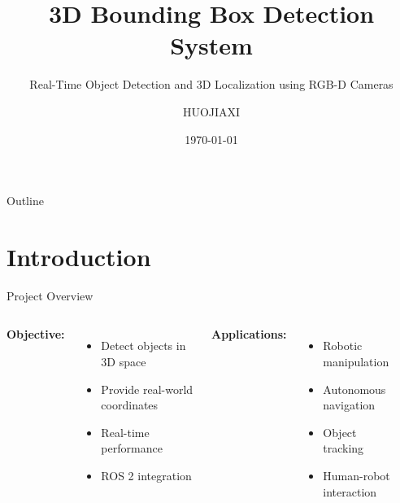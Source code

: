 \documentclass[aspectratio=169]{beamer}
\title{3D Bounding Box Detection System}
\subtitle{Real-Time Object Detection and 3D Localization using RGB-D Cameras}
\author{HUOJIAXI}
\institute{ROS 2 Humble + YOLO + Point Cloud Processing}
\date{\today}
\begin{document}
\begin{frame}
\titlepage
\end{frame}

\begin{frame}{Outline}
\tableofcontents
\end{frame}

\section{Introduction}

\begin{frame}{Project Overview}
\begin{columns}
\textbf{Objective:}
\begin{itemize}
    \item Detect objects in 3D space
    \item Provide real-world coordinates
    \item Real-time performance
    \item ROS 2 integration
\end{itemize}

\vspace{1em}
\textbf{Applications:}
\begin{itemize}
    \item Robotic manipulation
    \item Autonomous navigation
    \item Object tracking
    \item Human-robot interaction
\end{itemize}

\begin{center}
\end{center}
\end{columns}
\end{frame}
\end{document}
